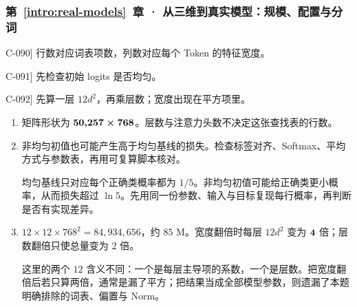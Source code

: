 \subsubsection*{第~\ref*{intro:real-models}~章 · 从三维到真实模型：规模、配置与分词}
\begin{answerhints}
\item[\hyperref[exercise:real-embedding-shape]{C-090}] \leavevmode{}\label{hint:real-embedding-shape}行数对应词表项数，列数对应每个 Token 的特征宽度。
\item[\hyperref[exercise:uniform-baseline-interpretation]{C-091}] \leavevmode{}\label{hint:uniform-baseline-interpretation}先检查初始 logits 是否均匀。
\item[\hyperref[exercise:compute-token-budget]{C-092}] \leavevmode{}\label{hint:compute-token-budget}先算一层 $12d^2$，再乘层数；宽度出现在平方项里。
\end{answerhints}
\begin{enumerate}[label={},leftmargin=4.8em,itemsep=4pt]
\item[\textbf{\hyperref[exercise:real-embedding-shape]{C-090.}}] \leavevmode{}\label{solution:C-090}\label{solution:real-embedding-shape}矩阵形状为 $\boldsymbol{50{,}257\times768}$。层数与注意力头数不决定这张查找表的行数。
\item[\textbf{\hyperref[exercise:uniform-baseline-interpretation]{C-091.}}] \leavevmode{}\label{solution:C-091}\label{solution:uniform-baseline-interpretation}非均匀初值也可能产生高于均匀基线的损失。检查标签对齐、Softmax、平均方式与参数表，再用可复算脚本核对。\par 均匀基线只对应每个正确类概率都为 $1/5$。非均匀初值可能给正确类更小概率，从而损失超过 $\ln5$。先用同一份参数、输入与目标复现每行概率，再判断是否有实现差异。
\item[\textbf{\hyperref[exercise:compute-token-budget]{C-092.}}] \leavevmode{}\label{solution:C-092}\label{solution:compute-token-budget}$12\times12\times768^2=84{,}934{,}656$，约 $85$ M。宽度翻倍时每层 $12d^2$ 变为 $\boldsymbol{4}$ 倍；层数翻倍只使总量变为 $2$ 倍。\par 这里的两个 $12$ 含义不同：一个是每层主导项的系数，一个是层数。把宽度翻倍后若只算两倍，通常是漏了平方；把结果当成全部模型参数，则遗漏了本题明确排除的词表、偏置与 Norm。
\end{enumerate}

